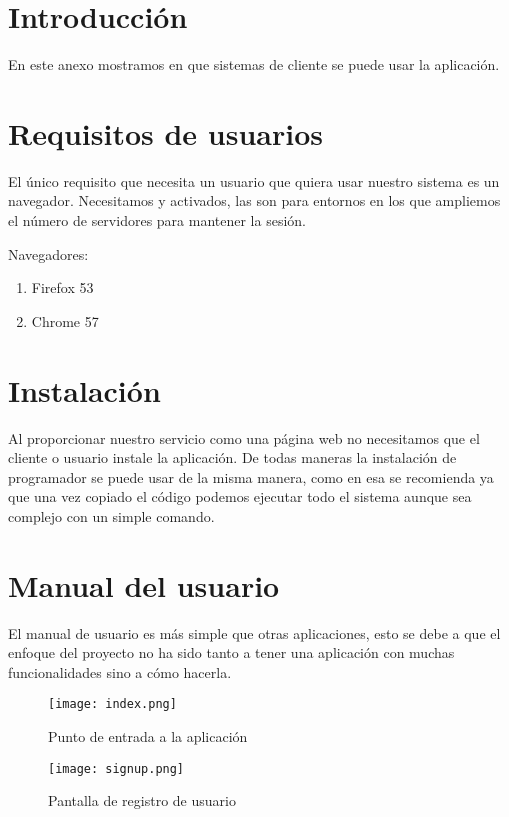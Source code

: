 
\section{Introducción}
En este anexo mostramos en que sistemas de cliente se puede usar la aplicación.

\section{Requisitos de usuarios}
El único requisito que necesita un usuario que quiera usar nuestro sistema es un navegador. Necesitamos  y  activados, las  son para entornos en los que ampliemos el número de servidores para mantener la sesión.

Navegadores:
\begin{enumerate}
\item Firefox 53
\item Chrome 57
\end{enumerate}


\section{Instalación}
Al proporcionar nuestro servicio como una página web no necesitamos que el cliente o usuario instale la aplicación. De todas maneras la instalación de programador se puede usar de la misma manera, como en esa se recomienda  ya que una vez copiado el código podemos ejecutar todo el sistema aunque sea complejo con un simple comando.

\section{Manual del usuario}
El manual de usuario es más simple que otras aplicaciones, esto se debe a que el enfoque del proyecto no ha sido tanto a tener una aplicación con muchas funcionalidades sino a cómo hacerla.



\begin{figure}
	\centering
	\texttt{[image: index.png]}
	\caption{Punto de entrada a la aplicación}\label{fig:index.png}
\end{figure}

\begin{figure}
	\centering
	\texttt{[image: signup.png]}
	\caption{Pantalla de registro de usuario}\label{fig:signup.png}
\end{figure}

